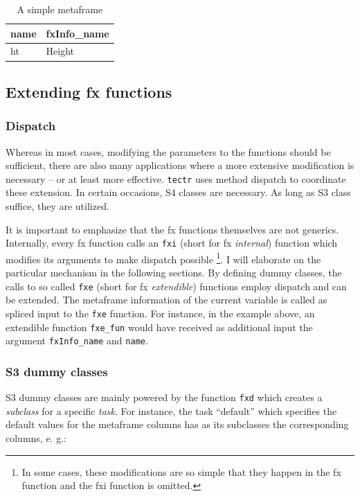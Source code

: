 \documentclass[]{report}
\let\rmarkdownfootnote\footnote%
\def\footnote{\protect\rmarkdownfootnote}
\theoremstyle{definition}
\theoremstyle{definition}
\theoremstyle{definition}
\theoremstyle{remark}
\begin{document}
\begin{table}

\caption{\label{tab:1st-mf}A simple metaframe}
\centering
\begin{tabular}[t]{ll}
\toprule
name & fxInfo\_name\\
\midrule
ht & Height\\
\bottomrule
\end{tabular}
\end{table}

\subsection{Extending fx functions}\label{extending-fx-functions}

\subsubsection{Dispatch}\label{dispatch}

Whereas in most cases, modifying the parameters to the functions should
be sufficient, there are also many applications where a more extensive
modification is necessary -- or at least more effective. \texttt{tectr}
uses method dispatch to coordinate these extension. In certain
occasions, S4 classes are necessary. As long as S3 class suffice, they
are utilized.

It is important to emphasize that the fx functions themselves are not
generics. Internally, every fx function calls an \texttt{fxi} (short for
fx \emph{internal}) function which modifies its arguments to make
dispatch possible \footnote{In some cases, these modifications are so
  simple that they happen in the fx function and the fxi function is
  omitted.}. I will elaborate on the particular mechanism in the
following sections. By defining dummy classes, the calls to so called
\texttt{fxe} (short for fx \emph{extendible}) functions employ dispatch
and can be extended. The metaframe information of the current variable
is called as spliced input to the \texttt{fxe} function. For instance,
in the example above, an extendible function \texttt{fxe\_fun} would
have received as additional input the argument \texttt{fxInfo\_name} and
\texttt{name}.

\subsubsection{S3 dummy classes}\label{s3-dummy-classes}

S3 dummy classes are mainly powered by the function \texttt{fxd} which
creates a \emph{subclass} for a specific \emph{task}. For instance, the
task ``default'' which specifies the default values for the metaframe
columns has as its subclasses the corresponding columns, e. g.:
\end{document}
